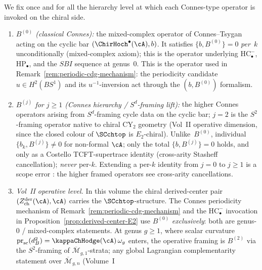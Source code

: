 \begin{remark}
\label{rem:B-j-hierarchy-convention-chiral}
%
%
We fix once and for all the hierarchy level at which
each Connes-type operator is invoked on the chiral side.
\begin{enumerate}[label=\textup{(\alph*)}]
\item \emph{$B^{(0)}$ \textup{(}classical Connes\textup{)}:} the
mixed-complex operator of
Connes--Tsygan~\textup{\cite{Con85,LQ84}} acting on the cyclic bar
$(\ChirHoch^\bullet(\cA), b)$. It satisfies
$\{b, B^{(0)}\} = 0$ \emph{per~$k$} unconditionally (mixed-complex
axiom); this is the operator underlying
$\mathrm{HC}^-_\bullet$, $\mathrm{HP}_\bullet$, and the
$SBI$ sequence at genus~$0$. This is the operator used in
Remark~\ref{rem:periodic-cdg-mechanism}: the periodicity candidate
$u \in H^2(BS^1)$ and its $u^{-1}$-inversion act through the
$(b, B^{(0)})$ formalism.
\item \emph{$B^{(j)}$ for $j\geq 1$ \textup{(}Connes hierarchy /
$S^d$-framing lift\textup{)}:} the higher Connes operators arising
from $S^d$-framing cycle data on the cyclic bar\textup{;}
$j=2$ is the $S^2$-framing operator native to chiral $\mathrm{CY}_2$
geometry \textup{(}Vol~II operative dimension, since the closed
colour of $\SCchtop$ is $E_2$-chiral\textup{)}. Unlike~$B^{(0)}$,
individual $\{b_k, B^{(j)}\}\neq 0$ for non-formal
$\cA$\textup{;} only the total
$\{b, B^{(j)}\} = 0$ holds, and only as a Costello
TCFT-supertrace identity \textup{(}cross-arity Stasheff
cancellation\textup{)}; \emph{never} per-$k$. Extending a
per-$k$ identity from $j=0$ to $j\geq 1$ is a scope error
\textup{:} the higher framed operators see cross-arity cancellations.
\item \emph{Vol~II operative level.} In this volume the chiral
derived-center pair $(Z^{\mathrm{der}}_{\mathrm{ch}}(\cA),\cA)$
carries the $\SCchtop$-structure. The Connes
periodicity mechanism of Remark~\ref{rem:periodic-cdg-mechanism}
and the $\mathrm{HC}^-_\bullet$ invocation in
Proposition~\ref{prop:derived-center-E2} use $B^{(0)}$
\emph{exclusively}: both are genus-$0$ / mixed-complex statements.
At genus $g\geq 1$, where scalar curvature
$\operatorname{pr}_{\mathrm{sc}}(d_B^2) = \kappaChHodge(\cA)\,\omega_g$ enters, the operative framing is
$B^{(2)}$ via the $S^2$-framing of
$\overline{\mathcal{M}}_{g,1}$-strata; any global Lagrangian
complementarity statement over
$\overline{\mathcal{M}}_{g,n}$ \textup{(}Volume~I

\end{enumerate}
\end{remark}
